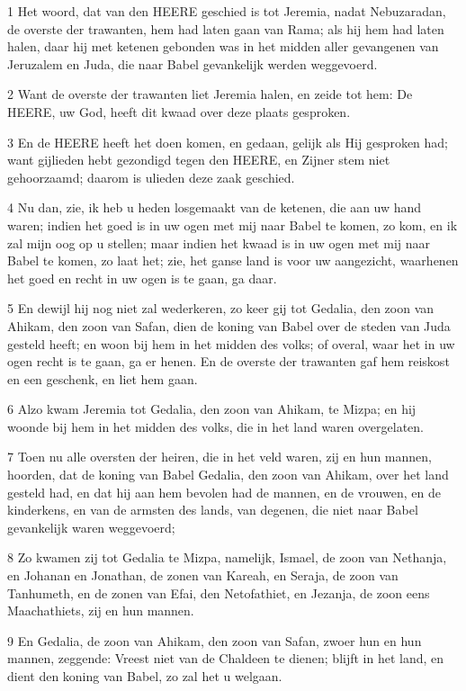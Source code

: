 \par 1 Het woord, dat van den HEERE geschied is tot Jeremia, nadat Nebuzaradan, de overste der trawanten, hem had laten gaan van Rama; als hij hem had laten halen, daar hij met ketenen gebonden was in het midden aller gevangenen van Jeruzalem en Juda, die naar Babel gevankelijk werden weggevoerd.
\par 2 Want de overste der trawanten liet Jeremia halen, en zeide tot hem: De HEERE, uw God, heeft dit kwaad over deze plaats gesproken.
\par 3 En de HEERE heeft het doen komen, en gedaan, gelijk als Hij gesproken had; want gijlieden hebt gezondigd tegen den HEERE, en Zijner stem niet gehoorzaamd; daarom is ulieden deze zaak geschied.
\par 4 Nu dan, zie, ik heb u heden losgemaakt van de ketenen, die aan uw hand waren; indien het goed is in uw ogen met mij naar Babel te komen, zo kom, en ik zal mijn oog op u stellen; maar indien het kwaad is in uw ogen met mij naar Babel te komen, zo laat het; zie, het ganse land is voor uw aangezicht, waarhenen het goed en recht in uw ogen is te gaan, ga daar.
\par 5 En dewijl hij nog niet zal wederkeren, zo keer gij tot Gedalia, den zoon van Ahikam, den zoon van Safan, dien de koning van Babel over de steden van Juda gesteld heeft; en woon bij hem in het midden des volks; of overal, waar het in uw ogen recht is te gaan, ga er henen. En de overste der trawanten gaf hem reiskost en een geschenk, en liet hem gaan.
\par 6 Alzo kwam Jeremia tot Gedalia, den zoon van Ahikam, te Mizpa; en hij woonde bij hem in het midden des volks, die in het land waren overgelaten.
\par 7 Toen nu alle oversten der heiren, die in het veld waren, zij en hun mannen, hoorden, dat de koning van Babel Gedalia, den zoon van Ahikam, over het land gesteld had, en dat hij aan hem bevolen had de mannen, en de vrouwen, en de kinderkens, en van de armsten des lands, van degenen, die niet naar Babel gevankelijk waren weggevoerd;
\par 8 Zo kwamen zij tot Gedalia te Mizpa, namelijk, Ismael, de zoon van Nethanja, en Johanan en Jonathan, de zonen van Kareah, en Seraja, de zoon van Tanhumeth, en de zonen van Efai, den Netofathiet, en Jezanja, de zoon eens Maachathiets, zij en hun mannen.
\par 9 En Gedalia, de zoon van Ahikam, den zoon van Safan, zwoer hun en hun mannen, zeggende: Vreest niet van de Chaldeen te dienen; blijft in het land, en dient den koning van Babel, zo zal het u welgaan.
